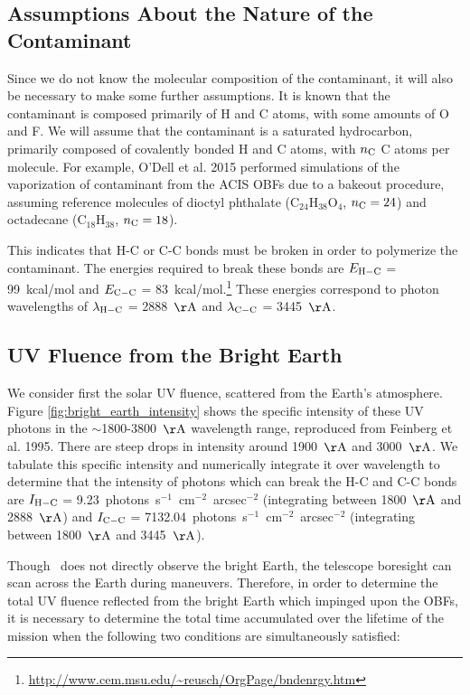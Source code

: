 \documentclass[11pt]{article}
\begin{document}
\subsection{Assumptions About the Nature of the Contaminant}

Since we do not know the molecular composition of the contaminant, it will also be necessary
to make some further assumptions. It is known that the contaminant is composed primarily of
H and C atoms, with some amounts of O and F. We will assume that the contaminant is a saturated
hydrocarbon, primarily composed of covalently bonded H and C atoms, with $n_{\rm C}$ C atoms
per molecule. For example, O'Dell et al. 2015 performed simulations of the vaporization of
contaminant from the ACIS OBFs due to a bakeout procedure, assuming reference molecules
of dioctyl phthalate (C$_{24}$H$_{38}$O$_4$, $n_{\rm C} = 24$) and octadecane (C$_{18}$H$_{38}$,
$n_{\rm C} = 18$).

This indicates that H-C or C-C bonds must be broken in order to polymerize the contaminant. The
energies required to break these bonds are $E_{\rm H-C}$ = 99~kcal/mol and $E_{\rm C-C}$ =
83~kcal/mol.\footnote{\url{http://www.cem.msu.edu/~reusch/OrgPage/bndenrgy.htm}} These energies
correspond to photon wavelengths of $\lambda_{\rm H-C}$ = 2888~${\rm \AA}$ and $\lambda_{\rm C-C}$
= 3445~${\rm \AA}$.

\subsection{UV Fluence from the Bright Earth}

We consider first the solar UV fluence, scattered from the Earth's atmosphere. Figure
\ref{fig:bright_earth_intensity} shows the specific intensity of these UV photons in
the $\sim$1800-3800~${\rm \AA}$ wavelength range, reproduced from Feinberg et al. 1995. There
are steep drops in intensity around 1900~${\rm \AA}$ and 3000~${\rm \AA}$. We tabulate
this specific intensity and numerically integrate it over wavelength to determine that
the intensity of photons which can break the H-C and C-C bonds are $I_{\rm H-C}$ =
9.23~photons~s$^{-1}$~cm$^{-2}$~arcsec$^{-2}$ (integrating between 1800~${\rm \AA}$ and
2888~${\rm \AA}$) and $I_{\rm C-C}$ = 7132.04~photons~s$^{-1}$~cm$^{-2}$~arcsec$^{-2}$
(integrating between 1800~${\rm \AA}$ and 3445~${\rm \AA}$).

Though \chandra~does not directly observe the bright Earth, the telescope boresight can scan
across the Earth during maneuvers. Therefore, in order to determine the total UV fluence
reflected from the bright Earth which impinged upon the OBFs, it is necessary to determine
the total time accumulated over the lifetime of the mission when the following two conditions
are simultaneously satisfied:
\end{document}
